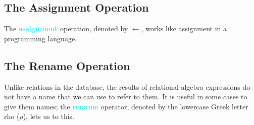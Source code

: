 \documentclass{Beautybook-EN}
\newcommand{\textcy}[1]{\textbf{\textcolor{cyan}{#1}}}
\begin{document}
\subsection{The Assignment Operation}

The \textcy{assignment} operation, denoted by $\leftarrow$, works like assignment in a programming language.

\subsection{The Rename Operation}

Unlike relations in the database, the results of relational-algebra expressions do not have a name that we can use to refer to them. It is useful in some cases to give them names; the \textcy{rename} operator, denoted by the lowercase Greek letter rho ($\rho$), lets us to this.

{ %
\normalem
\thispagestyle{empty}}
\makebottomcover
\end{document}
